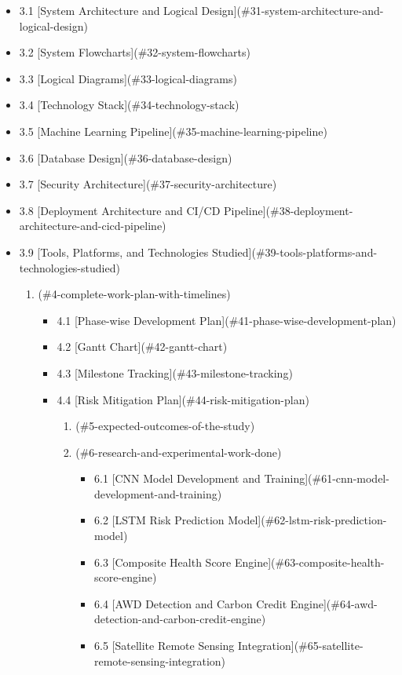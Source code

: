 \documentclass[12pt, a4paper]{report}
\begin{document}
\begin{enumerate}[leftmargin=*]
\begin{itemize}[leftmargin=*]
\begin{enumerate}[leftmargin=*]
\begin{itemize}[leftmargin=*]
\begin{enumerate}[leftmargin=*]
\begin{itemize}[leftmargin=*]
  \item 3.1 [System Architecture and Logical Design](\#31-system-architecture-and-logical-design)
  \item 3.2 [System Flowcharts](\#32-system-flowcharts)
  \item 3.3 [Logical Diagrams](\#33-logical-diagrams)
  \item 3.4 [Technology Stack](\#34-technology-stack)
  \item 3.5 [Machine Learning Pipeline](\#35-machine-learning-pipeline)
  \item 3.6 [Database Design](\#36-database-design)
  \item 3.7 [Security Architecture](\#37-security-architecture)
  \item 3.8 [Deployment Architecture and CI/CD Pipeline](\#38-deployment-architecture-and-cicd-pipeline)
  \item 3.9 [Tools, Platforms, and Technologies Studied](\#39-tools-platforms-and-technologies-studied)
\begin{enumerate}[leftmargin=*]
  \item [Complete Work Plan with Timelines](\#4-complete-work-plan-with-timelines)
\begin{itemize}[leftmargin=*]
  \item 4.1 [Phase-wise Development Plan](\#41-phase-wise-development-plan)
  \item 4.2 [Gantt Chart](\#42-gantt-chart)
  \item 4.3 [Milestone Tracking](\#43-milestone-tracking)
  \item 4.4 [Risk Mitigation Plan](\#44-risk-mitigation-plan)
\begin{enumerate}[leftmargin=*]
  \item [Expected Outcomes of the Study](\#5-expected-outcomes-of-the-study)
  \item [Research and Experimental Work Done](\#6-research-and-experimental-work-done)
\begin{itemize}[leftmargin=*]
  \item 6.1 [CNN Model Development and Training](\#61-cnn-model-development-and-training)
  \item 6.2 [LSTM Risk Prediction Model](\#62-lstm-risk-prediction-model)
  \item 6.3 [Composite Health Score Engine](\#63-composite-health-score-engine)
  \item 6.4 [AWD Detection and Carbon Credit Engine](\#64-awd-detection-and-carbon-credit-engine)
  \item 6.5 [Satellite Remote Sensing Integration](\#65-satellite-remote-sensing-integration)

\end{itemize}
\end{enumerate}
\end{itemize}
\end{enumerate}
\end{itemize}
\end{enumerate}
\end{itemize}
\end{enumerate}
\end{itemize}
\end{enumerate}
\end{document}
